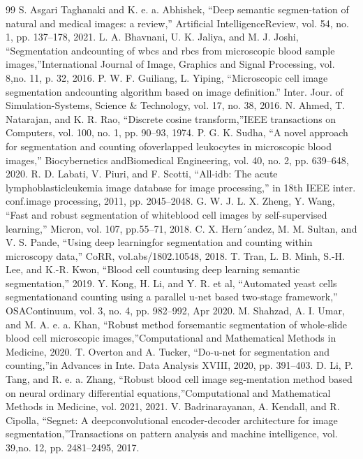 \documentclass[conference]{IEEEtran}
\begin{document}

\begin{thebibliography}{99}
 S. Asgari Taghanaki and K. e. a. Abhishek, “Deep semantic segmen-tation of natural and medical images: a review,” Artificial IntelligenceReview, vol. 54, no. 1, pp. 137–178, 2021.
 L. A. Bhavnani, U. K. Jaliya, and M. J. Joshi, “Segmentation andcounting of wbcs and rbcs from microscopic blood sample images,”International Journal of Image, Graphics and Signal Processing, vol. 8,no. 11, p. 32, 2016.
 P. W. F. Guiliang, L. Yiping, “Microscopic cell image segmentation andcounting algorithm based on image definition.” Inter. Jour. of Simulation-Systems, Science & Technology, vol. 17, no. 38, 2016.
 N. Ahmed, T. Natarajan, and K. R. Rao, “Discrete cosine transform,”IEEE transactions on Computers, vol. 100, no. 1, pp. 90–93, 1974.
 P. G. K. Sudha, “A novel approach for segmentation and counting ofoverlapped leukocytes in microscopic blood images,” Biocybernetics andBiomedical Engineering, vol. 40, no. 2, pp. 639–648, 2020.
 R. D. Labati, V. Piuri, and F. Scotti, “All-idb: The acute lymphoblasticleukemia image database for image processing,” in 18th IEEE inter. conf.image processing, 2011, pp. 2045–2048.
 G. W. J. L. X. Zheng, Y. Wang, “Fast and robust segmentation of whiteblood cell images by self-supervised learning,” Micron, vol. 107, pp.55–71, 2018.
 C. X. Hern´andez, M. M. Sultan, and V. S. Pande, “Using deep learningfor segmentation and counting within microscopy data,” CoRR, vol.abs/1802.10548, 2018.
 T. Tran, L. B. Minh, S.-H. Lee, and K.-R. Kwon, “Blood cell countusing deep learning semantic segmentation,” 2019.
 Y. Kong, H. Li, and Y. R. et al, “Automated yeast cells segmentationand counting using a parallel u-net based two-stage framework,” OSAContinuum, vol. 3, no. 4, pp. 982–992, Apr 2020.
 M. Shahzad, A. I. Umar, and M. A. e. a. Khan, “Robust method forsemantic segmentation of whole-slide blood cell microscopic images,”Computational and Mathematical Methods in Medicine, 2020.
 T. Overton and A. Tucker, “Do-u-net for segmentation and counting,”in Advances in Inte. Data Analysis XVIII, 2020, pp. 391–403.
 D. Li, P. Tang, and R. e. a. Zhang, “Robust blood cell image seg-mentation method based on neural ordinary differential equations,”Computational and Mathematical Methods in Medicine, vol. 2021, 2021.
 V. Badrinarayanan, A. Kendall, and R. Cipolla, “Segnet: A deepconvolutional encoder-decoder architecture for image segmentation,”Transactions on pattern analysis and machine intelligence, vol. 39,no. 12, pp. 2481–2495, 2017.
\end{thebibliography}
\end{document}
